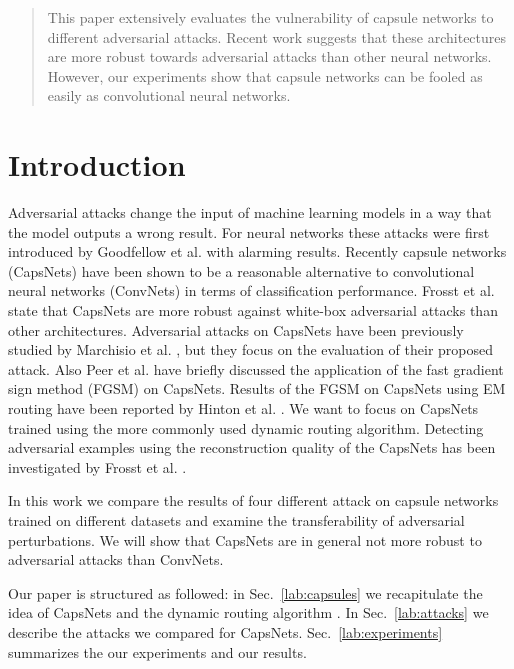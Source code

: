 \documentclass{article}
\begin{document}
\printAffiliationsAndNotice{\icmlEqualContribution} %

\begin{abstract}
	This paper extensively evaluates the vulnerability of capsule networks to different adversarial attacks. Recent work suggests that these architectures are more robust towards adversarial attacks than other neural networks. However, our experiments show that capsule networks can be fooled as easily as convolutional neural networks.
\end{abstract}

\section{Introduction}
Adversarial attacks change the input of machine learning models in a way that the model outputs a wrong result. For neural networks these attacks were first introduced by Goodfellow et al.  with alarming results. Recently capsule networks (CapsNets) \cite{capsules} have been shown to be a reasonable alternative to convolutional neural networks (ConvNets) in terms of classification performance. Frosst et al.  state that CapsNets are more robust against white-box adversarial attacks than other architectures. Adversarial attacks on CapsNets have been previously studied by Marchisio et al. , but they focus on the evaluation of their proposed attack. Also Peer et al.  have briefly discussed the application of the fast gradient sign method (FGSM) \cite{fgsm} on CapsNets. Results of the FGSM on CapsNets using EM routing have been reported by Hinton et al. . We want to focus on CapsNets trained using the more commonly used dynamic routing algorithm. Detecting adversarial examples using the reconstruction quality of the CapsNets has been investigated by Frosst et al. . 

In this work we compare the results of four different attack on capsule networks trained on different datasets and examine the transferability of adversarial perturbations. We will show that CapsNets are in general not more robust to adversarial attacks than ConvNets.

Our paper is structured as followed: in Sec.~\ref{lab:capsules} we
recapitulate the idea of CapsNets and the dynamic routing algorithm
\cite{capsules}. In Sec.~\ref{lab:attacks} we describe the attacks
we compared for CapsNets. Sec.~\ref{lab:experiments} summarizes the our experiments and our results.
\end{document}
